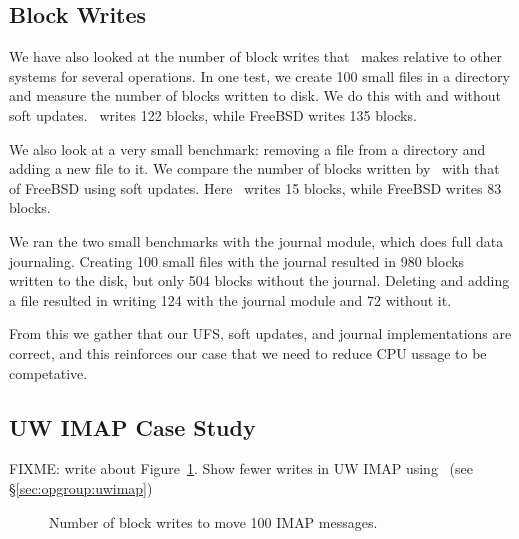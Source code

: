 \subsection {Block Writes}
We have also looked at the number of block writes that \Kudos\ makes
relative to other systems for several operations. In one test, we
create 100 small files in a directory and measure the number of blocks
written to disk. We do this with and without soft updates. \Kudos\
writes 122 blocks, while FreeBSD writes 135 blocks.

We also look at a very small benchmark: removing a file from a
directory and adding a new file to it. We compare the number of blocks
written by \Kudos\ with that of FreeBSD using soft updates. Here
\Kudos\ writes 15 blocks, while FreeBSD writes 83 blocks.

We ran the two small benchmarks with the journal module, which does
full data journaling. Creating 100 small files with the journal
resulted in 980 blocks written to the disk, but only 504 blocks
without the journal. Deleting and adding a file resulted in writing
124 with the journal module and 72 without it.

From this we gather that our UFS, soft updates, and journal
implementations are correct, and this reinforces our case that we need
to reduce CPU ussage to be competative.

\subsection {UW IMAP Case Study}
\label{sec:evaluation:uwimap}

FIXME: write about Figure~\ref{fig:imap-compare}.
Show fewer writes in UW IMAP using \opgroups\ (see \S\ref{sec:opgroup:uwimap})

\begin{figure}[htb]
\caption{\label{fig:imap-compare} Number of block writes to move 100
  IMAP messages.}
\end{figure}
